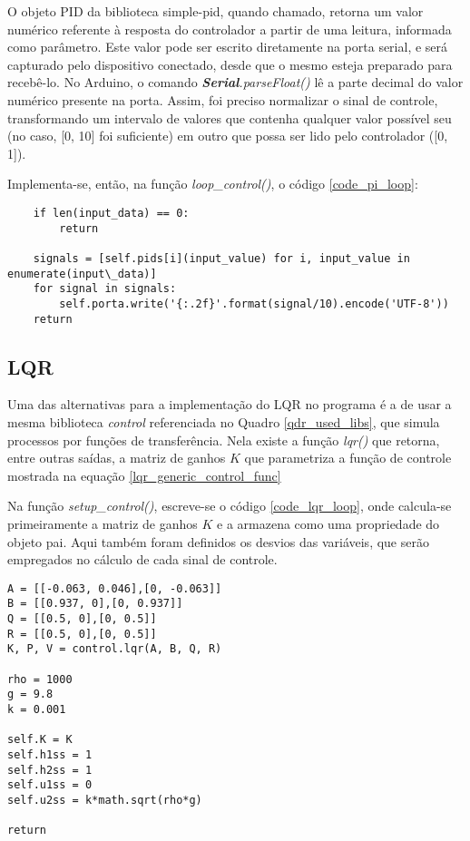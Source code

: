 O objeto PID da biblioteca simple-pid, quando chamado, retorna um valor numérico referente à resposta do controlador a partir de uma leitura, informada como parâmetro. Este valor pode ser escrito diretamente na porta serial, e será capturado pelo dispositivo conectado, desde que o mesmo esteja preparado para recebê-lo. No Arduino, o comando \emph{\textbf{Serial}.parseFloat()} lê a parte decimal do valor numérico presente na porta. Assim, foi preciso normalizar o sinal de controle, transformando um intervalo de valores que contenha qualquer valor possível seu (no caso, [0, 10] foi suficiente) em outro que possa ser lido pelo controlador ([0, 1]).

Implementa-se, então, na função \emph{loop\_control()}, o código \ref{code_pi_loop}:

\begin{code}
\begin{lstlisting}
	if len(input_data) == 0:
		return

	signals = [self.pids[i](input_value) for i, input_value in enumerate(input\_data)]
	for signal in signals:
		self.porta.write('{:.2f}'.format(signal/10).encode('UTF-8'))
	return
\end{lstlisting}
\label{code_pi_loop}
\end{code}

\subsection{LQR}

Uma das alternativas para a implementação do LQR no programa é a de usar a mesma biblioteca \emph{control} referenciada no Quadro \ref{qdr_used_libs}, que simula processos por funções de transferência. Nela existe a função \emph{lqr()} que retorna, entre outras saídas, a matriz de ganhos $K$ que parametriza a função de controle mostrada na equação \eqref{lqr_generic_control_func}

Na função \emph{setup\_control()}, escreve-se o código \ref{code_lqr_loop}, onde calcula-se primeiramente a matriz de ganhos $K$ e a armazena como uma propriedade do objeto pai. Aqui também foram definidos os desvios das variáveis, que serão empregados no cálculo de cada sinal de controle.

\begin{code}
\begin{lstlisting}
A = [[-0.063, 0.046],[0, -0.063]]
B = [[0.937, 0],[0, 0.937]]
Q = [[0.5, 0],[0, 0.5]]
R = [[0.5, 0],[0, 0.5]]
K, P, V = control.lqr(A, B, Q, R)

rho = 1000
g = 9.8
k = 0.001

self.K = K
self.h1ss = 1
self.h2ss = 1
self.u1ss = 0
self.u2ss = k*math.sqrt(rho*g)

return
\end{lstlisting}
\label{code_lqr_loop}
\end{code}

